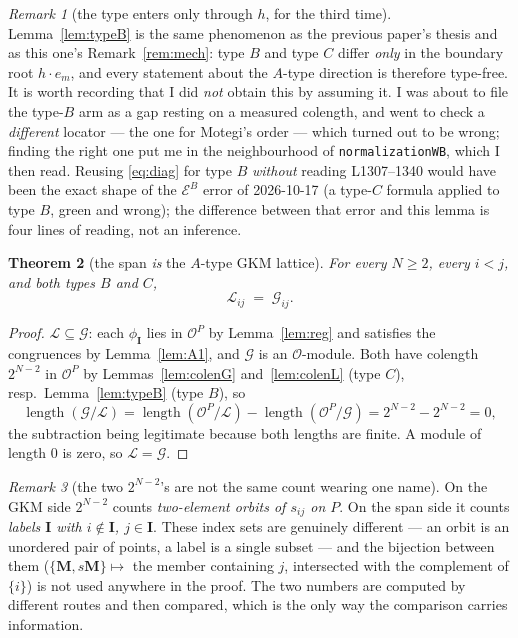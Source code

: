 \documentclass[11pt]{article}
\theoremstyle{plain}
\newtheorem{thm}{Theorem}
\theoremstyle{definition}
\theoremstyle{remark}
\newtheorem{rem}[thm]{Remark}
\theoremstyle{plain}
\newcommand{\bI}{\mathbf{I}}
\newcommand{\bM}{\mathbf{M}}
\newcommand{\Lat}{\mathcal{L}}
\newcommand{\Gkm}{\mathcal{G}}
\begin{document}
\begin{rem}[the type enters only through $h$, for the third time]
Lemma~\ref{lem:typeB} is the same phenomenon as the previous paper's thesis and
as this one's Remark~\ref{rem:mech}: type $B$ and type $C$ differ \emph{only} in
the boundary root $h\cdot e_m$, and every statement about the $A$-type direction
is therefore type-free.  It is worth recording that I did \emph{not} obtain this
by assuming it.  I was about to file the type-$B$ arm as a gap resting on a
measured colength, and went to check a \emph{different} locator --- the one for
Motegi's order --- which turned out to be wrong; finding the right one put me in
the neighbourhood of \texttt{normalizationWB}, which I then read.  Reusing
\eqref{eq:diag} for type $B$ \emph{without} reading L1307--1340 would have been
the exact shape of the $\mathcal{E}^B$ error of 2026-10-17 (a type-$C$ formula
applied to type $B$, green and wrong); the difference between that error and this
lemma is four lines of reading, not an inference.
\end{rem}

\begin{thm}[the span \emph{is} the $A$-type GKM lattice]\label{thm:A}
For every $N\ge2$, every $i<j$, and \emph{both} types $B$ and $C$,
\[
   \Lat_{ij}\;=\;\Gkm_{ij}.
\]
\end{thm}

\begin{proof}
$\Lat\subseteq\Gkm$: each $\phi_\bI$ lies in $\mathcal{O}^P$ by
Lemma~\ref{lem:reg} and satisfies the congruences by Lemma~\ref{lem:A1}, and
$\Gkm$ is an $\mathcal{O}$-module.  Both have colength $2^{N-2}$ in
$\mathcal{O}^P$ by Lemmas~\ref{lem:colenG} and~\ref{lem:colenL} (type $C$), resp.\
Lemma~\ref{lem:typeB} (type $B$), so
\[
  \operatorname{length}(\Gkm/\Lat)
  =\operatorname{length}(\mathcal{O}^P/\Lat)-\operatorname{length}(\mathcal{O}^P/\Gkm)
  =2^{N-2}-2^{N-2}=0,
\]
the subtraction being legitimate because both lengths are finite.  A module of
length $0$ is zero, so $\Lat=\Gkm$.
\end{proof}

\begin{rem}[the two $2^{N-2}$'s are not the same count wearing one name]
On the GKM side $2^{N-2}$ counts \emph{two-element orbits of $s_{ij}$ on $P$}.
On the span side it counts \emph{labels $\bI$ with $i\notin\bI$, $j\in\bI$}.
These index sets are genuinely different --- an orbit is an unordered pair of
points, a label is a single subset --- and the bijection between them
($\{\bM,s\bM\}\mapsto$ the member containing $j$, intersected with the
complement of $\{i\}$) is not used anywhere in the proof.  The two numbers are
computed by different routes and then compared, which is the only way the
comparison carries information.
\end{rem}
\end{document}
